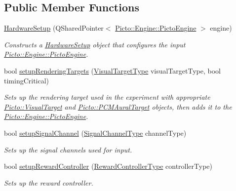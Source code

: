 \subsection*{Public Member Functions}
\begin{DoxyCompactItemize}
\item 
\hypertarget{class_hardware_setup_ac373e5ac14b566519590bc113408fb67}{\hyperlink{class_hardware_setup_ac373e5ac14b566519590bc113408fb67}{Hardware\-Setup} (Q\-Shared\-Pointer$<$ \hyperlink{class_picto_1_1_engine_1_1_picto_engine}{Picto\-::\-Engine\-::\-Picto\-Engine} $>$ engine)}\label{class_hardware_setup_ac373e5ac14b566519590bc113408fb67}

\begin{DoxyCompactList}\small\item\em Constructs a \hyperlink{class_hardware_setup}{Hardware\-Setup} object that configures the input \hyperlink{class_picto_1_1_engine_1_1_picto_engine}{Picto\-::\-Engine\-::\-Picto\-Engine}. \end{DoxyCompactList}\item 
bool \hyperlink{class_hardware_setup_ac1699cea38d2eaa236d8f4d94e279854}{setup\-Rendering\-Targets} (\hyperlink{class_hardware_setup_a69c004a7774626593182bda8c88c1005}{Visual\-Target\-Type} visual\-Target\-Type, bool timing\-Critical)
\begin{DoxyCompactList}\small\item\em Sets up the rendering target used in the experiment with appropriate \hyperlink{class_picto_1_1_visual_target}{Picto\-::\-Visual\-Target} and \hyperlink{class_picto_1_1_p_c_m_aural_target}{Picto\-::\-P\-C\-M\-Aural\-Target} objects, then adds it to the \hyperlink{class_picto_1_1_engine_1_1_picto_engine}{Picto\-::\-Engine\-::\-Picto\-Engine}. \end{DoxyCompactList}\item 
bool \hyperlink{class_hardware_setup_a79cc88d4063ce1e8f8e57e8ccc4da370}{setup\-Signal\-Channel} (\hyperlink{class_hardware_setup_a47f2dfba54bc1a8d0bbd64d885d638e6}{Signal\-Channel\-Type} channel\-Type)
\begin{DoxyCompactList}\small\item\em Sets up the signal channels used for input. \end{DoxyCompactList}\item 
bool \hyperlink{class_hardware_setup_a47b22c5078bbc71691d97475525f9fd3}{setup\-Reward\-Controller} (\hyperlink{class_hardware_setup_adca8a1e846871351eea56002364cd9bf}{Reward\-Controller\-Type} controller\-Type)
\begin{DoxyCompactList}\small\item\em Sets up the reward controller. \end{DoxyCompactList}\item 

\end{DoxyCompactItemize}
